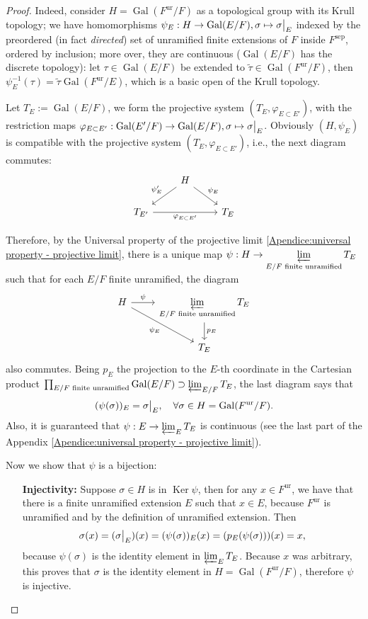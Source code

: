 \documentclass[12pt]{article}
\theoremstyle{plain}
\theoremstyle{definition}
\newcommand{\Ker}{\operatorname{Ker}}
\renewcommand{\tilde}[1]{\widetilde{#1}}
\newcommand\rest[2]{{%
  \left.\kern-\nulldelimiterspace %
  #1 %
  \vphantom{\big|} %
  \right|_{#2} %
  }}
\newcommand{\Gal}[2]{\operatorname{Gal} ( #1 / #2 )}
\newcommand{\sep}[1]{{#1}^{\operatorname{sep}}}
\newcommand{\ur}[1]{{#1}^{\operatorname{ur}}}
\begin{document}
\begin{proof}
Indeed, consider $H = \Gal {\ur F} F$ as a topological group with its Krull topology; we have homomorphisms $\psi_E : H \to \Gal E F, \sigma \mapsto \rest \sigma E$ indexed by the preordered (in fact \textit{directed}) set of unramified finite extensions of $F$ inside $\sep F$, ordered by inclusion; more over, they are continuous ($\Gal E F$ has the discrete topology): let $\tau \in \Gal E F$ be extended to $\tilde \tau \in \Gal {\ur F} F$, then $\psi_E^{-1} (\tau) = \tilde \tau \Gal {\ur F} E$, which is a basic open of the Krull topology.

Let $T_E := \Gal E F$, we form the projective system $(T_E, \varphi_{E \subset E'})$, with the restriction maps $\varphi_{E \subset E'} : \Gal {E'} F \to \Gal E F, \sigma \mapsto \rest \sigma E$. Obviously $(H, \psi_E)$ is compatible with the projective system $(T_E, \varphi_{E \subset E'})$, i.e., the next diagram commutes:
\[
    \begin{tikzcd}
    &H\ar[dl, "\psi_E'"'] \ar[rd, "\psi_E"]&\\
    T_{E'} \ar[rr, "\varphi_{E \subset E'}"'] & & T_E
    \end{tikzcd}
\]

Therefore, by the Universal property of the projective limit \ref{Apendice:universal property - projective limit}, there is a unique map $\psi : H  \to \varprojlim\limits_{E / F \text{ finite unramified}} T_E$ such that for each $E / F$ finite unramified, the diagram
\[
    \begin{tikzcd}
    H \ar[r, "\psi"] \ar[rd, "\psi_E"']& \varprojlim\limits_{E/F \text{ finite unramified}} T_E \ar[d, "p_E"]\\
    & T_E
    \end{tikzcd}
\]
also commutes. Being $p_E$ the projection to the $E$-th coordinate in the Cartesian product $\prod_{E / F \text{ finite unramified}} \Gal {E} F \supset \varprojlim_{E/F} T_E$, the last diagram says that
\[
    (\psi (\sigma))_E = \rest \sigma E , \quad \forall \sigma \in H = \Gal {\ur F} F.
\]
Also, it is guaranteed that $\psi : E \to \varprojlim_E T_E$ is continuous (see the last part of the Appendix \ref{Apendice:universal property - projective limit}).

\bigskip

Now we show that $\psi$ is a bijection:
\begin{enumerate}
\item[\textbf{Injectivity:}] Suppose $\sigma \in H$ is in $\Ker \psi$, then for any $x \in \ur F$, we have that there is a finite unramified extension $E$ such that $x \in E$, because $\ur F$ is unramified and by the definition of unramified extension. Then
\[
    \sigma (x) = (\rest \sigma E) (x) = (\psi (\sigma))_E (x) = (p_E (\psi (\sigma)))(x) = x,
\]
because $\psi (\sigma)$ is the identity element in $\varprojlim_E T_E$. Because $x$ was arbitrary, this proves that $\sigma$ is the identity element in $H = \Gal {\ur F} F$, therefore $\psi$ is injective.


\end{enumerate}
\end{proof}
\end{document}
